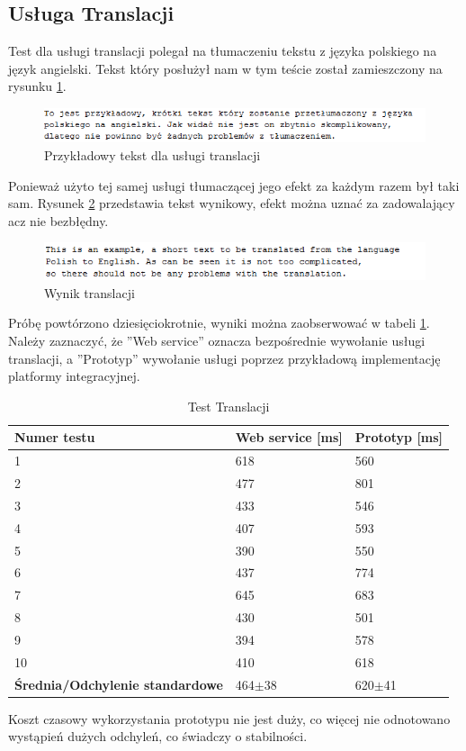 \subsection{Usługa Translacji}
Test dla usługi translacji polegał na tłumaczeniu tekstu z języka polskiego na język angielski. Tekst który posłużył nam w tym teście został zamieszczony na rysunku \ref{fig:translatorExample}.
\begin{figure}[!h]
\centering
\includegraphics[scale=0.9]{translatorExample.png}
\caption{Przykładowy tekst dla usługi translacji}\label{fig:translatorExample}
\end{figure}
Ponieważ użyto tej samej usługi tłumaczącej jego efekt za każdym razem był taki sam. Rysunek \ref{fig:translatorResult} przedstawia tekst wynikowy, efekt można uznać za zadowalający acz nie bezbłędny. 
\begin{figure}[!h]
\centering
\includegraphics[scale=0.9]{translatorResult.png}
\caption{Wynik translacji}\label{fig:translatorResult}
\end{figure}
\newpage
Próbę powtórzono dziesięciokrotnie, wyniki można zaobserwować w tabeli \ref{tab:translacja}. Należy zaznaczyć, że ''Web service'' oznacza bezpośrednie wywołanie usługi translacji, a ''Prototyp'' wywołanie usługi poprzez przykładową implementację platformy integracyjnej.

\begin{center}
	\begin{table}[h]
	\centering
	\begin{tabular}{| l | l | l |}	
		\hline
		\textbf{Numer testu} & \textbf{Web service [ms]} & \textbf{Prototyp [ms]} \\ \hline
		1 & 618 & 560\\ \hline
		2 & 477 & 801\\ \hline
		3 & 433 & 546\\ \hline
		4 & 407 & 593\\ \hline
		5 & 390 & 550\\ \hline
		6 & 437 & 774\\ \hline
		7 & 645 & 683\\ \hline
		8 & 430 & 501\\ \hline
		9 & 394 & 578\\ \hline
		10 & 410 & 618\\ \hline
		\textbf{Średnia/Odchylenie standardowe} & 464$\pm$38 & 620$\pm$41\\ 
		\hline
	\end{tabular}
	\caption{Test Translacji}
	\label{tab:translacja}
	\end{table}
\end{center}
Koszt czasowy wykorzystania prototypu nie jest duży, co więcej nie odnotowano wystąpień dużych odchyleń, co świadczy o stabilności.

